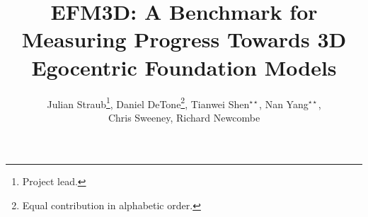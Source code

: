 \documentclass[runningheads]{llncs}
\begin{document}

\title{EFM3D: A Benchmark for Measuring Progress Towards 3D Egocentric Foundation Models} 

\author{Julian Straub\thanks{Project lead.}, Daniel DeTone\thanks{Equal contribution in alphabetic order.}, Tianwei Shen$^{\star\star}$, Nan Yang$^{\star\star}$, \\
Chris Sweeney, Richard Newcombe}



\maketitle

\begin{abstract}

\end{abstract}











\clearpage




\clearpage

\appendix

\end{document}
